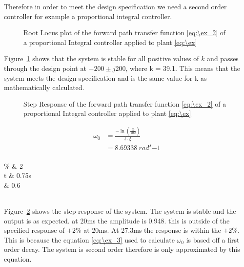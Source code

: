 Therefore in order to meet the design specification we need a second order controller for example a proportional integral controller.\\


\begin{figure}[ht!]
	\centering
	
	\caption{Root Locus plot of the forward path transfer function \eqref{eq:\ex_2} of a proportional Integral controller applied to plant \eqref{eq:\ex} \appendixamble{\ex}}
	\label{fig:\ex_1}
\end{figure}\FloatBarrier

Figure~\ref{fig:\ex_1} shows that the system is stable for all positive values of $k$ and passes through the design point at $-200 \pm j200$, where k = 39.1. This means that the system meets the design specification and is the same value for k as mathematically calculated.\\

\begin{figure}[ht!]
	\centering
	
	\caption{Step Response of the forward path transfer function \eqref{eq:\ex_2} of a proportional Integral controller applied to plant \eqref{eq:\ex} \appendixamble{\ex}}
	\label{fig:\ex_2}
\end{figure}\FloatBarrier

\begin{equation}
	\begin{split}
		\omega_{0} &= \frac{-\ln(\frac{\%}{100})}{t\cdot\xi}\\
		&=8.69338\ rad^s{-1}\\
	\end{split}\label{eq:\ex_3}
\end{equation}

\begin{conditions}
	\% & 2    \\
	t & 0.75s \\
	\xi & 0.6 \\
\end{conditions}\\

Figure~\ref{fig:\ex_2} shows the step response of the system. The system is stable and the output is as expected. at 20ms the amplitude is 0.948. this is outside of the specified response of $\pm 2\%$ at 20ms. At 27.3ms the response is within the $\pm 2\%$. This is because the equation \eqref{eq:\ex_3} used to calculate $\omega_0$ is based off a first order decay. The system is second order therefore is only approximated by this equation.\\
